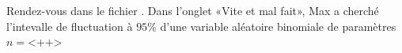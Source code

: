 
\begin{exercice}\label{exosmath-0385}

    Rendez-vous dans le fichier . Dans l'onglet «Vite et mal fait», Max a cherché l'intevalle de fluctuation à \( 95\%\) d'une variable aléatoire binomiale de paramètres \( n=\)<++>

\end{exercice}
